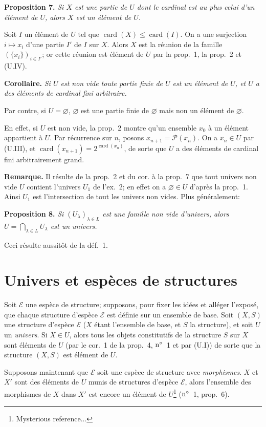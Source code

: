 \documentclass[12pt]{article}
\newcommand{\nn}{\noindent}
\newcommand{\card}{\operatorname{card}}
\begin{document}
\nn\textbf{Proposition 7.} \emph{Si $X$ est une partie de $U$ dont le cardinal est au plus celui d'un élément de $U$, alors $X$ est un élément de $U$.}

Soit $I$ un élément de $U$ tel que $\card(X)\leq \card(I)$. On a une surjection $i\mapsto x_i$ d'une partie $I'$ de $I$ sur $X$. Alors $X$ est la réunion de la famille $(\{x_i\})_{i\in I'}$; or cette réunion est élément de $U$ par la prop.~1, la prop.~2 et (U.IV).

\nn\textbf{Corollaire.} \emph{Si $U$ est non vide toute partie finie de $U$ est un élément de $U$, et $U$ a des éléments de cardinal fini arbitraire.}

Par contre, si $U=\varnothing$, $\varnothing$ est une partie finie de $\varnothing$ mais non un élément de $\varnothing$.

En effet, si $U$ est non vide, la prop.~2 montre qu'un ensemble $x_0$ à un élément appartient à $U$. Par récurrence sur $n$, posons $x_{n+1}=\mathcal{P}(x_n)$. On a $x_n\in U$ par (U.III), et $\card(x_{n+1})=2^{\card(x_n)}$, de sorte que $U$ a des éléments de cardinal fini arbitrairement grand.

\nn\textbf{Remarque.} Il résulte de la prop.~2 et du cor. à la prop.~7 que tout univers non vide $U$ contient l'univers $U_1$ de l'ex.~2; en effet on a $\varnothing\in U$ d'après la prop.~1. Ainsi $U_1$ est l'intersection de tout les univers non vides. Plus généralement:

\nn\textbf{Proposition 8.} \emph{Si $(U_{\lambda})_{\lambda\in L}$ est une famille non vide d'univers, alors $U=\bigcap_{\lambda\in L}U_{\lambda}$ est un univers.}

Ceci résulte aussitôt de la déf.~1.

\section{Univers et espèces de structures}

Soit $\mathcal{E}$ une espèce de structure; supposons, pour fixer les idées et alléger l'exposé, que chaque structure d'espèce $\mathcal{E}$ est définie sur un ensemble de base. Soit $(X,S)$ une structure d'espèce $\mathcal{E}$ ($X$ étant l'ensemble de base, et $S$ la structure), et soit $U$ un \emph{univers}. Si $X\in U$, alors tous les objets constitutifs de la structure $S$ sur $X$ sont éléments de $U$ (par le cor.~1 de la prop.~4, $\rm n^\circ$~1 et par (U.I)) de sorte que la structure $(X,S)$ est élément de $U$.

Supposons maintenant que $\mathcal{E}$ soit une espèce de structure avec \emph{morphismes}. $X$ et $X'$ sont des éléments de $U$ munis de structures d'espèce $\mathcal{E}$, alors l'ensemble des morphismes de $X$ dans $X'$ est encore un élément de $U$\footnote{Mysterious reference...} ($\rm n^\circ$~1, prop.~6).
\end{document}
